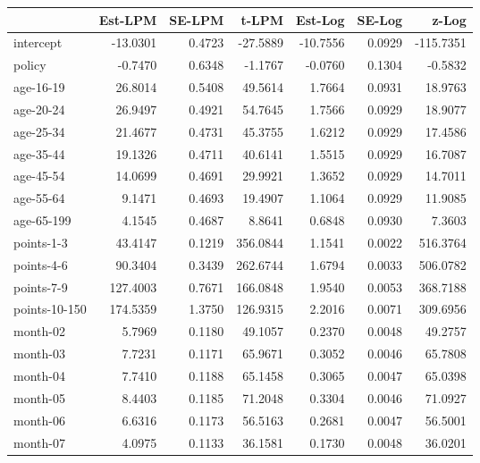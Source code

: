 \documentclass[10pt]{article}
\begin{document}
\clearpage
\pagebreak




\begin{table}[ht]
\centering
\begin{tabular}{lrrrrrr}
  \hline
 & Est-LPM & SE-LPM & t-LPM & Est-Log & SE-Log & z-Log \\ 
  \hline
intercept & -13.0301 & 0.4723 & -27.5889 & -10.7556 & 0.0929 & -115.7351 \\ 
  policy & -0.7470 & 0.6348 & -1.1767 & -0.0760 & 0.1304 & -0.5832 \\ 
  age-16-19 & 26.8014 & 0.5408 & 49.5614 & 1.7664 & 0.0931 & 18.9763 \\ 
  age-20-24 & 26.9497 & 0.4921 & 54.7645 & 1.7566 & 0.0929 & 18.9077 \\ 
  age-25-34 & 21.4677 & 0.4731 & 45.3755 & 1.6212 & 0.0929 & 17.4586 \\ 
  age-35-44 & 19.1326 & 0.4711 & 40.6141 & 1.5515 & 0.0929 & 16.7087 \\ 
  age-45-54 & 14.0699 & 0.4691 & 29.9921 & 1.3652 & 0.0929 & 14.7011 \\ 
  age-55-64 & 9.1471 & 0.4693 & 19.4907 & 1.1064 & 0.0929 & 11.9085 \\ 
  age-65-199 & 4.1545 & 0.4687 & 8.8641 & 0.6848 & 0.0930 & 7.3603 \\ 
  points-1-3 & 43.4147 & 0.1219 & 356.0844 & 1.1541 & 0.0022 & 516.3764 \\ 
  points-4-6 & 90.3404 & 0.3439 & 262.6744 & 1.6794 & 0.0033 & 506.0782 \\ 
  points-7-9 & 127.4003 & 0.7671 & 166.0848 & 1.9540 & 0.0053 & 368.7188 \\ 
  points-10-150 & 174.5359 & 1.3750 & 126.9315 & 2.2016 & 0.0071 & 309.6956 \\ 
  month-02 & 5.7969 & 0.1180 & 49.1057 & 0.2370 & 0.0048 & 49.2757 \\ 
  month-03 & 7.7231 & 0.1171 & 65.9671 & 0.3052 & 0.0046 & 65.7808 \\ 
  month-04 & 7.7410 & 0.1188 & 65.1458 & 0.3065 & 0.0047 & 65.0398 \\ 
  month-05 & 8.4403 & 0.1185 & 71.2048 & 0.3304 & 0.0046 & 71.0927 \\ 
  month-06 & 6.6316 & 0.1173 & 56.5163 & 0.2681 & 0.0047 & 56.5001 \\ 
  month-07 & 4.0975 & 0.1133 & 36.1581 & 0.1730 & 0.0048 & 36.0201 \\ 

\end{tabular}
\end{table}
\end{document}
